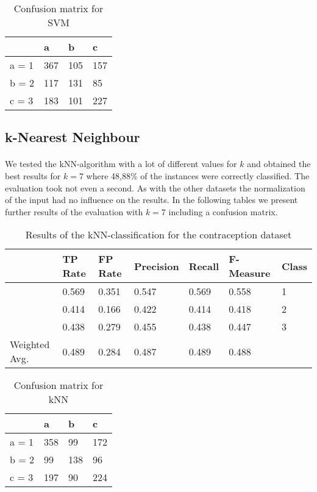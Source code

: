 \documentclass[paper=a4, fontsize=11pt]{scrartcl} %
\numberwithin{equation}{section} %
\numberwithin{figure}{section} %
\numberwithin{table}{section} %
\begin{document}
\begin{table}[h]
\centering
\begin{tabular}{|l|lll|}
	\hline
	      &a   &b   &c \\
	\hline
	a = 1 &367 &105 &157 \\
 	b = 2 &117 &131 &85 \\
 	c = 3 &183 &101 &227 \\
  \hline
\end{tabular}
\caption{Confusion matrix for SVM}
\end{table}


\subsection{k-Nearest Neighbour}

\paragraph{}We tested the kNN-algorithm with a lot of different values for $k$ and obtained the best results for $k=7$ where 48,88\% of the instances were correctly classified. The evaluation took not even a second. As with the other datasets the normalization of the input had no influence on the results. In the following tables we present further results of the evaluation with $k=7$ including a confusion matrix.

\begin{table}[h]
\centering
\begin{tabular}{lllllll}
	\toprule
	&								TP Rate   	&FP Rate   &Precision   &Recall  &F-Measure     	&Class\\
	\midrule
									&0.569     	&0.351     &0.547     	&0.569   &0.558      	     	&1\\
                 	&0.414     	&0.166     &0.422     	&0.414   &0.418      	    	&2\\
                 	&0.438     	&0.279     &0.455     	&0.438   &0.447      	    	&3\\

	Weighted Avg.   &0.489     	&0.284     &0.487     	&0.489   &0.488      				&\\
	\bottomrule
\end{tabular}
\caption{Results of the kNN-classification for the contraception dataset}
\end{table}

\vspace{6pt}

\begin{table}[h]
\centering
\begin{tabular}{|l|lll|}
	\hline
	      &a   &b   &c \\
	\hline
    a = 1 &358 &99  &172\\
    b = 2 &99  &138 &96 \\
 	c = 3 &197 &90  &224 \\
  \hline
\end{tabular}
\caption{Confusion matrix for kNN}
\end{table}
\end{document}
